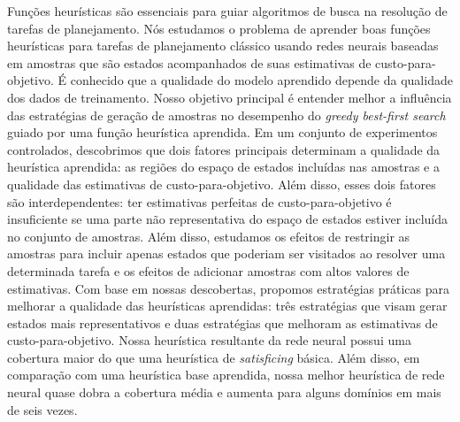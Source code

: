 \begin{translatedabstract}
Funções heurísticas são essenciais para guiar algoritmos de busca na resolução de tarefas de planejamento.
Nós estudamos o problema de aprender boas funções heurísticas para tarefas de planejamento clássico usando redes neurais baseadas em amostras que são estados acompanhados de suas estimativas de custo-para-objetivo. É conhecido que a qualidade do modelo aprendido depende da qualidade dos dados de treinamento. Nosso objetivo principal é entender melhor a influência das estratégias de geração de amostras no desempenho do \emph{greedy best-first search} guiado por uma função heurística aprendida.
Em um conjunto de experimentos controlados, descobrimos que dois fatores principais determinam a qualidade da heurística aprendida: as regiões do espaço de estados incluídas nas amostras e a qualidade das estimativas de custo-para-objetivo. Além disso, esses dois fatores são interdependentes: ter estimativas perfeitas de custo-para-objetivo é insuficiente se uma parte não representativa do espaço de estados estiver incluída no conjunto de amostras.
Além disso, estudamos os efeitos de restringir as amostras para incluir apenas estados que poderiam ser visitados ao resolver uma determinada tarefa e os efeitos de adicionar amostras com altos valores de estimativas.
Com base em nossas descobertas, propomos estratégias práticas para melhorar a qualidade das heurísticas aprendidas: três estratégias que visam gerar estados mais representativos e duas estratégias que melhoram as estimativas de custo-para-objetivo.
Nossa heurística resultante da rede neural possui uma cobertura maior do que uma heurística de \emph{satisficing} básica. Além disso, em comparação com uma heurística base aprendida, nossa melhor heurística de rede neural quase dobra a cobertura média e aumenta para alguns domínios em mais de seis vezes.
\end{translatedabstract}
